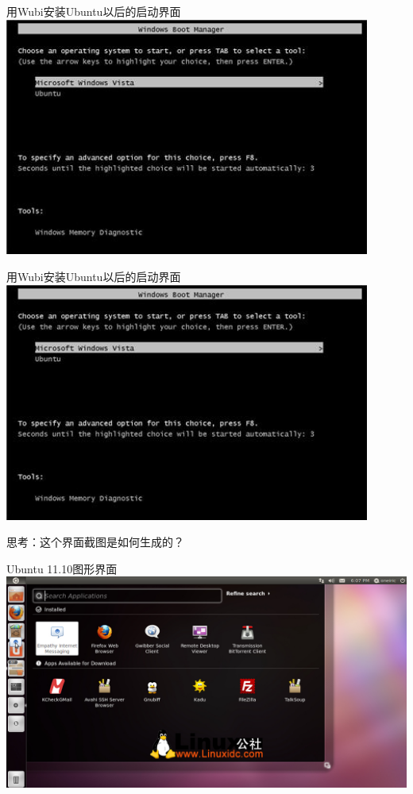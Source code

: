 \documentclass[xcolor=svgnames]{beamer}
\begin{document}
\begin{CJK*}{UTF8}{gbsn}
\begin{frame}{用Wubi安装Ubuntu以后的启动界面}
\includegraphics[width=0.9\textwidth]{boot-screen.jpg}
\end{frame}

\begin{frame}{用Wubi安装Ubuntu以后的启动界面}
\includegraphics[width=0.9\textwidth]{boot-screen.jpg}

思考：这个界面截图是如何生成的？
\end{frame}

\begin{frame}{Ubuntu 11.10图形界面}
\includegraphics[width=1.0\textwidth]{ubuntu-1110.jpg}
\end{frame}


\end{CJK*}
\end{document}
